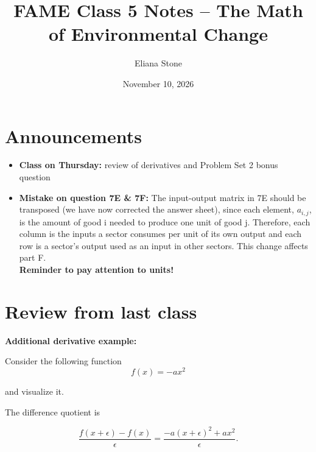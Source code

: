 \documentclass[12pt]{article}
\title{FAME Class 5 Notes -- The Math of Environmental Change}
\author{Eliana Stone}
\date{November 10, 2026}
\begin{document}
\maketitle

\section{Announcements}
\begin{itemize}
    \item \textbf{Class on Thursday:} review of derivatives and Problem Set 2 bonus question
    \item \textbf{Mistake on question 7E \& 7F:} The input-output matrix in 7E should be transposed (we have now corrected the answer sheet), since each element, \(a_{i,j}\), is the amount of good i needed to produce one unit of good j. Therefore, each column is the inputs a sector consumes per unit of its own output and each row is a sector's output used as an input in other sectors. This change affects part F. \\
    
    \textbf{Reminder to pay attention to units!}
\end{itemize}

\section{Review from last class}

\textbf{Additional derivative example:}

Consider the following function
\[f(x) = -ax^2\]

and visualize it.

\begin{center}
    
\end{center}

The difference quotient is

\[
\frac{f(x+\epsilon)-f(x)}{\epsilon}
=
\frac{-a(x+\epsilon)^2+ax^2}{\epsilon}.
\]
\end{document}
